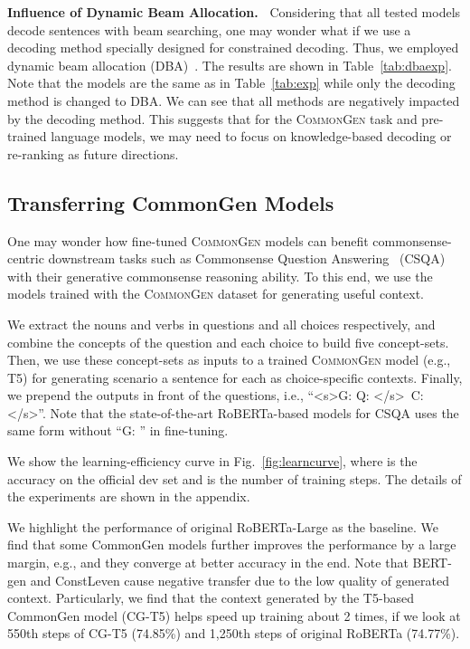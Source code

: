 \documentclass[11pt,a4paper]{article}
\begin{document}
\noindent
 \textbf{Influence of Dynamic Beam Allocation.~}
Considering that all tested models decode sentences with beam searching, one may wonder what if we use a decoding method specially designed for constrained decoding.
 Thus, we employed dynamic beam allocation (DBA)~\cite{post-vilar-2018-fast}.
 The results are shown in Table~\ref{tab:dbaexp}.
 Note that the models are the same as in Table~\ref{tab:exp} while only the decoding method is changed to DBA.
 We can see that all methods are negatively impacted by the decoding method.
 This suggests that for the \textsc{CommonGen} task and pre-trained language models, we may need to focus on knowledge-based decoding or re-ranking as future directions.
	
    \subsection{Transferring CommonGen Models}
    \label{ssec:transfer}
    One may wonder how fine-tuned \textsc{CommonGen} models can benefit commonsense-centric downstream tasks such as Commonsense Question Answering~\cite{Talmor2018CommonsenseQAAQ} (CSQA) with their generative commonsense reasoning ability.
    To this end, we use the models trained with the \textsc{CommonGen} dataset for generating useful context. 


    We extract the nouns and verbs in questions and all choices respectively, and combine the concepts of the question  and each choice  to build five concept-sets. 
    Then, we use these concept-sets as inputs to a trained \textsc{CommonGen} model (e.g., T5) for generating scenario a sentence  for each as choice-specific contexts.
    Finally, we prepend the outputs in front of the questions, i.e., ``\textless s\textgreater G:   Q:  \textless /s\textgreater~C:  \textless /s\textgreater ''. Note that the  state-of-the-art RoBERTa-based models for CSQA uses the same form without ``G: '' in fine-tuning.
   
    
    We show the learning-efficiency curve in Fig.~\ref{fig:learncurve}, where  is the accuracy on the official dev set and  is the number of training steps.
    The details of the experiments are shown in the appendix.


    We highlight the performance of original RoBERTa-Large as the baseline.
    We find that some CommonGen models further improves the performance by a large margin, e.g.,  and they converge at better accuracy in the end. Note that BERT-gen and ConstLeven cause negative transfer due to the low quality of generated context. 
    Particularly, we find that the context generated by the T5-based CommonGen model (CG-T5) helps speed up training about 2 times, if we look at 550th steps of CG-T5 (74.85\%) and 1,250th steps of original RoBERTa (74.77\%).
	
\end{document}
